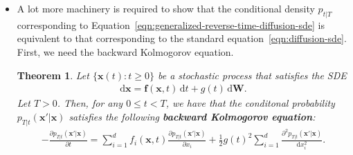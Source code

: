 \documentclass[10pt]{article}
\newtheorem{theorem}[lemma]{Theorem}
\newcommand{\dee}{\mathrm{d}}
\newcommand{\ve}[1]{\mathbf{#1}}
\begin{document}
\begin{itemize}
  \item A lot more machinery is required to show that the conditional density $p_{t|T}$ corresponding to Equation~\eqref{eqn:generalized-reverse-time-diffusion-sde} is equivalent to that corresponding to the standard equation~\eqref{eqn:diffusion-sde}. First, we need the backward Kolmogorov equation.
  \begin{theorem}
    Let $\{ \ve{x}(t) : t \geq 0 \}$ be a stochastic process that satisfies the SDE
    \begin{align*}
      \dee \ve{x} = \ve{f}(\ve{x},t)\, \dee t + g(t)\, \dee\ve{W}.
    \end{align*}
    Let $T > 0$. Then, for any $0 \leq t < T$, we have that the conditonal probability $p_{T|t}(\ve{x}'|\ve{x})$ satisfies the following {\bf backward Kolmogorov equation}:
    \begin{align*}
      -\frac{\partial p_{T|t}(\ve{x}'|\ve{x})}{\partial t}
      = \sum_{i=1}^d f_i(\ve{x},t) \frac{\partial p_{T|t}(\ve{x}'|\ve{x})}{\partial x_i} + \frac{1}{2} g(t)^2 \sum_{i=1}^d \frac{\partial^2 p_{T|t}(\ve{x}'|\ve{x})}{\dee x_i^2}.
    \end{align*}
  \end{theorem}


\end{itemize}
\end{document}
